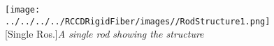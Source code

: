 \begin{figure}[H]
\centering
\texttt{[image: ../../../../RCCDRigidFiber/images//RodStructure1.png]}
[Single Ros.]{\textit{A single rod showing the structure}}
\label{fig:RodStructure}
\end{figure}
